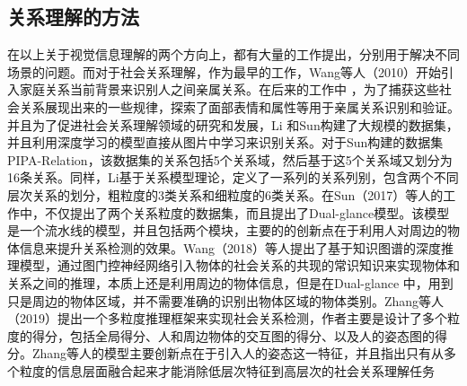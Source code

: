 \subsection{关系理解的方法}
在以上关于视觉信息理解的两个方向上，都有大量的工作提出，分别用于解决不同场景的问题。而对于社会关系理解，作为最早的工作，Wang等人（2010）\cite{wang2010seeing}开始引入家庭关系当前背景来识别人之间亲属关系。在后来的工作中
\cite{dibeklioglu2013like,xia2012understanding,chen2012discovering}，为了捕获这些社会关系展现出来的一些规律，探索了面部表情和属性等用于亲属关系识别和验证。并且为了促进社会关系理解领域的研究和发展，Li\cite{li2017dual-glance} 和Sun\cite{sun2017a}构建了大规模的数据集，并且利用深度学习的模型直接从图片中学习来识别关系。对于Sun构建的数据集PIPA-Relation，该数据集的关系包括5个关系域，然后基于这5个关系域又划分为16条关系。同样，Li基于关系模型理论，定义了一系列的关系列别，包含两个不同层次关系的划分，粗粒度的3类关系和细粒度的6类关系。在Sun（2017）等人的工作中，不仅提出了两个关系粒度的数据集，而且提出了Dual-glance模型。该模型是一个流水线的模型，并且包括两个模块，主要的的创新点在于利用人对周边的物体信息来提升关系检测的效果。Wang（2018）等人提出了基于知识图谱的深度推理模型，通过图门控神经网络引入物体的社会关系的共现的常识知识来实现物体和关系之间的推理，本质上还是利用周边的物体信息，但是在Dual-glance 中，用到只是周边的物体区域，并不需要准确的识别出物体区域的物体类别。Zhang等人（2019）提出一个多粒度推理框架来实现社会关系检测，作者主要是设计了多个粒度的得分，包括全局得分、人和周边物体的交互图的得分、以及人的姿态图的得分。Zhang等人的模型主要创新点在于引入人的姿态这一特征，并且指出只有从多个粒度的信息层面融合起来才能消除低层次特征到高层次的社会关系理解任务

